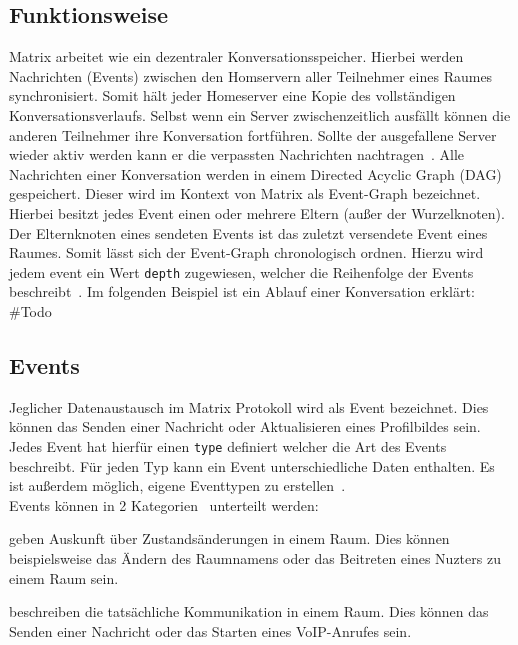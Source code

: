     \subsection{Funktionsweise}\label{subsec:funktionsweise}
    Matrix arbeitet wie ein dezentraler Konversationsspeicher.
    Hierbei werden Nachrichten (Events) zwischen den Homservern aller Teilnehmer eines Raumes synchronisiert.
    Somit hält jeder Homeserver eine Kopie des vollständigen Konversationsverlaufs.
    Selbst wenn ein Server zwischenzeitlich ausfällt können die anderen Teilnehmer ihre Konversation fortführen.
    Sollte der ausgefallene Server wieder aktiv werden kann er die verpassten Nachrichten nachtragen~\cite{matrix}.
    Alle Nachrichten einer Konversation werden in einem Directed Acyclic Graph (DAG) gespeichert.
    Dieser wird im Kontext von Matrix als Event-Graph bezeichnet.
    Hierbei besitzt jedes Event einen oder mehrere Eltern (außer der Wurzelknoten).
    Der Elternknoten eines sendeten Events ist das zuletzt versendete Event eines Raumes.
    Somit lässt sich der Event-Graph chronologisch ordnen.
    Hierzu wird jedem event ein Wert \texttt{depth} zugewiesen, welcher die Reihenfolge der Events beschreibt~\cite{eventgraph}.
    Im folgenden Beispiel ist ein Ablauf einer Konversation erklärt:\\

    \#Todo

%    

    \newpage
    \subsection{Events}\label{sec:events}
    Jeglicher Datenaustausch im Matrix Protokoll wird als Event bezeichnet.
    Dies können das Senden einer Nachricht oder Aktualisieren eines Profilbildes sein.
    Jedes Event hat hierfür einen \texttt{type} definiert welcher die Art des Events beschreibt.
    Für jeden Typ kann ein Event unterschiedliche Daten enthalten.
    Es ist außerdem möglich, eigene Eventtypen zu erstellen~\cite{events}.\\
    Events können in 2 Kategorien~\cite{roomevents} unterteilt werden:
    \begin{description}[leftmargin=!,labelwidth=3.5cm]
        \item [State events] geben Auskunft über Zustandsänderungen in einem Raum. Dies können beispielsweise das Ändern des Raumnamens oder das Beitreten eines Nuzters zu einem Raum sein.
        \item [Message events] beschreiben die tatsächliche Kommunikation in einem Raum. Dies können das Senden einer Nachricht oder das Starten eines VoIP-Anrufes sein.
    \end{description}

